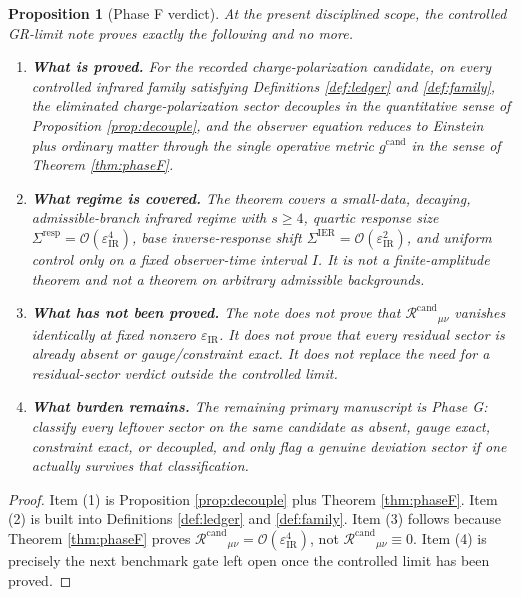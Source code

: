 \documentclass[11pt]{article}
\newcommand{\CandidateMetric}{g^{\mathrm{cand}}}
\newcommand{\BaseShift}{\Sigma^{\mathrm{IER}}}
\newcommand{\ResponseShift}{\Sigma^{\mathrm{resp}}}
\newcommand{\RemCand}{\mathcal R^{\mathrm{cand}}}
\newcommand{\IRsmall}{\varepsilon_{\mathrm{IR}}}
\newtheorem{proposition}{Proposition}
\begin{document}
\begin{proposition}[Phase F verdict]
\label{prop:verdict}
At the present disciplined scope, the controlled GR-limit note proves exactly the following and no more.
\begin{enumerate}
    \item \textbf{What is proved.} For the recorded charge-polarization candidate, on every controlled infrared family satisfying Definitions \ref{def:ledger} and \ref{def:family}, the eliminated charge-polarization sector decouples in the quantitative sense of Proposition \ref{prop:decouple}, and the observer equation reduces to Einstein plus ordinary matter through the single operative metric \(\CandidateMetric\) in the sense of Theorem \ref{thm:phaseF}.
    \item \textbf{What regime is covered.} The theorem covers a small-data, decaying, admissible-branch infrared regime with \(s\ge4\), quartic response size \(\ResponseShift=\mathcal O(\IRsmall^4)\), base inverse-response shift \(\BaseShift=\mathcal O(\IRsmall^2)\), and uniform control only on a fixed observer-time interval \(I\). It is not a finite-amplitude theorem and not a theorem on arbitrary admissible backgrounds.
    \item \textbf{What has \emph{not} been proved.} The note does not prove that \(\RemCand{}_{\mu\nu}\) vanishes identically at fixed nonzero \(\IRsmall\). It does not prove that every residual sector is already absent or gauge/constraint exact. It does not replace the need for a residual-sector verdict outside the controlled limit.
    \item \textbf{What burden remains.} The remaining primary manuscript is Phase G: classify every leftover sector on the same candidate as absent, gauge exact, constraint exact, or decoupled, and only flag a genuine deviation sector if one actually survives that classification.
\end{enumerate}
\end{proposition}

\begin{proof}
Item (1) is Proposition \ref{prop:decouple} plus Theorem \ref{thm:phaseF}. Item (2) is built into Definitions \ref{def:ledger} and \ref{def:family}. Item (3) follows because Theorem \ref{thm:phaseF} proves \(\RemCand{}_{\mu\nu}=\mathcal O(\IRsmall^4)\), not \(\RemCand{}_{\mu\nu}\equiv0\). Item (4) is precisely the next benchmark gate left open once the controlled limit has been proved.
\end{proof}
\end{document}
